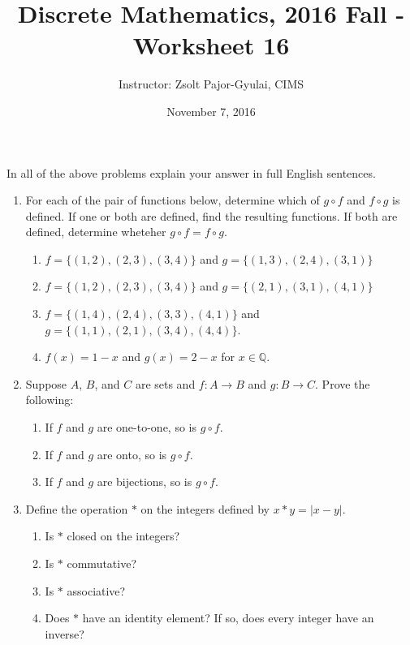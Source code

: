 \documentclass[11pt]{preprint}
\title{Discrete Mathematics, 2016 Fall - Worksheet 16}
\author{Instructor: Zsolt Pajor-Gyulai, CIMS}
\date{November 7, 2016}
\def\enumb{\begin{enumerate}}
\def\enume{\end{enumerate}}
\begin{document}
\maketitle

In all of the above problems explain your answer in full English sentences.

\enumb
\item For each of the pair of functions below, determine which of $g\circ f$ and $f\circ g$ is defined. If one or both are defined, find the resulting functions. If both are defined, determine wheteher $g\circ f=f\circ g$.

\enumb
\item $f=\{(1,2),(2,3),(3,4)\}$ and $g=\{(1,3),(2,4),(3,1)\}$
\item $f=\{(1,2),(2,3),(3,4)\}$ and $g=\{(2,1),(3,1),(4,1)\}$
\item $f=\{(1,4),(2,4),(3,3),(4,1)\}$ and $g=\{(1,1),(2,1),(3,4),(4,4)\}$.
\item $f(x)=1-x$ and $g(x)=2-x$ for $x\in\mathbb{Q}$.
\enume

\item Suppose $A$, $B$, and $C$ are sets and $f:A\to B$ and $g:B\to C$. Prove the following:
\enumb
\item If $f$ and $g$ are one-to-one, so is $g\circ f$.
\item If $f$ and $g$ are onto, so is $g\circ f$.
\item If $f$ and $g$ are bijections, so is $g\circ f$.
\enume

\item Define the operation $*$ on the integers defined by $x*y=|x-y|$.
\enumb
\item Is $*$ closed on the integers?
\item Is $*$ commutative?
\item Is $*$ associative?
\item Does $*$ have an identity element? If so, does every integer have an inverse?
\enume



\enume
\end{document}
